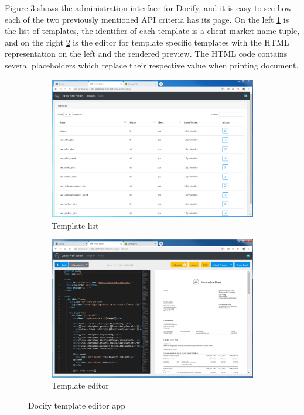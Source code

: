 Figure \ref{fig:docify} shows the administration interface for Docify, and it is easy to see how each of the two previously mentioned API criteria has its page. On the left \ref{fig:docify:a} is the list of templates, the identifier of each template is a client-market-name tuple, and on the right \ref{fig:docify:b} is the editor for template specific templates with the HTML representation on the left and the rendered preview. The HTML code contains several placeholders which replace their respective value when printing document.

\begin{figure}
  \begin{subfigure}[b]{0.5\linewidth}
    \includegraphics[width=\linewidth]{assets/docify-template-list.png}
    \caption{Template list}
    \label{fig:docify:a}
  \end{subfigure}
  \begin{subfigure}[b]{0.5\linewidth}
    \includegraphics[width=\linewidth]{assets/docify-editor.png}
    \caption{Template editor}
    \label{fig:docify:b}
  \end{subfigure}
  \caption{Docify template editor app}
  \label{fig:docify}
\end{figure}

